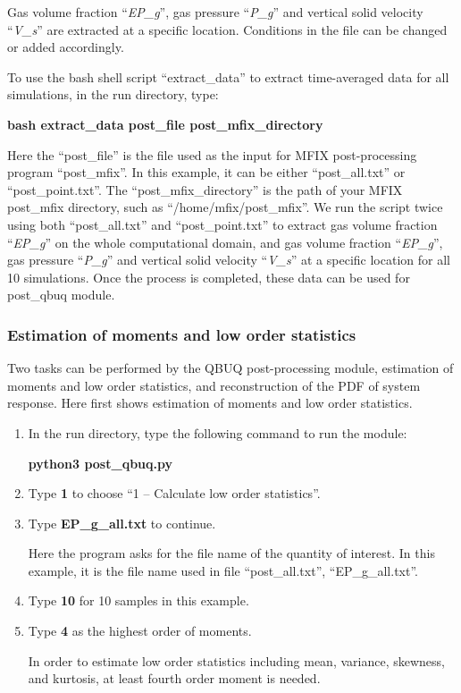 \documentclass[a4paper,12pt,titlepage]{article}
\begin{document}
Gas volume fraction ``\emph{EP\_g}'', gas pressure ``\emph{P\_g}'' and vertical
solid velocity ``\emph{V\_s}'' are extracted at a specific location. Conditions
in the file can be changed or added accordingly.

To use the bash shell script ``extract\_data'' to extract time-averaged data for
all simulations, in the run directory, type:

\textbf{bash extract\_data post\_file post\_mfix\_directory}

Here the ``post\_file'' is the file used as the input for MFIX post-processing
program ``post\_mfix''. In this example, it can be either ``post\_all.txt'' or
``post\_point.txt''. The ``post\_mfix\_directory'' is the path of your MFIX\\
post\_mfix directory, such as ``/home/mfix/post\_mfix''. We run the script
twice using both ``post\_all.txt'' and ``post\_point.txt'' to extract gas 
volume fraction ``\emph{EP\_g}'' on the whole computational domain, and gas
volume fraction ``\emph{EP\_g}'', gas pressure ``\emph{P\_g}'' and vertical
solid velocity ``\emph{V\_s}'' at a specific location for all 10 simulations. 
Once the process is completed, these data can be used for post\_qbuq module.

\subsubsection{Estimation of moments and low order statistics}
\label{sec:LowOrder}

Two tasks can be performed by the QBUQ post-processing module, estimation of 
moments and low order statistics, and reconstruction of the PDF of system
response. Here first shows estimation of moments and low order statistics. 

\begin{enumerate}[leftmargin=0cm,itemindent=0.5cm]
 \item In the run directory, type the following command to run the module:
 
  \textbf{python3 post\_qbuq.py}
  
 \item Type \textbf{1} to choose ``1 -- Calculate low order statistics''.
 
 \item Type \textbf{EP\_g\_all.txt} to continue.
 
 Here the program asks for the file name of the quantity of interest. In this 
 example, it is the file name used in file ``post\_all.txt'', ``EP\_g\_all.txt''.
 
 \item Type \textbf{10} for 10 samples in this example.
 
 \item Type \textbf{4} as the highest order of moments.
 
 In order to estimate low order statistics including mean, variance, skewness, 
 and kurtosis, at least fourth order moment is needed.
\end{enumerate}
\end{document}

